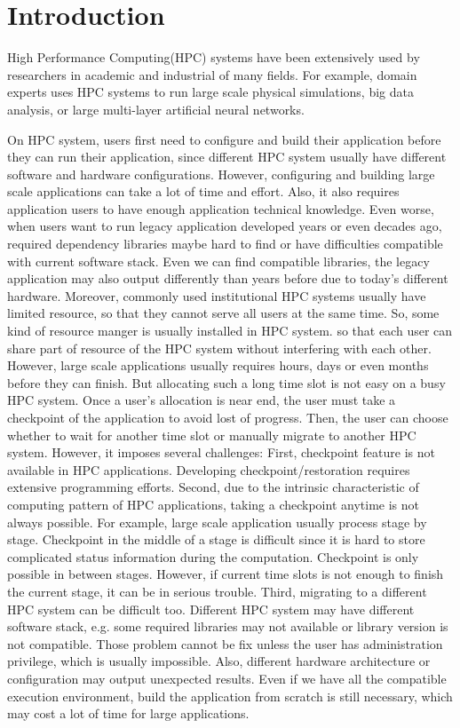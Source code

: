 \section{Introduction}
  \label{sec:introduction}

High Performance Computing(HPC) systems have been extensively used by researchers in academic and industrial of many fields. For example, domain experts uses HPC systems to run large scale physical simulations, big data analysis, or large multi-layer artificial neural networks. 

On HPC system, users first need to configure and build their application before they can run their application, since different HPC system usually have different software and hardware configurations. However, configuring and building large scale applications can take a lot of time and effort. Also, it also requires application users to have enough application technical knowledge. Even worse, when users want to run legacy application developed years or even decades ago, required dependency libraries maybe hard to find or have difficulties compatible with current software stack. Even we can find compatible libraries, the legacy application may also output differently than years before due to today's different hardware. Moreover, commonly used institutional HPC systems usually have limited resource, so that they cannot serve all users at the same time. So, some kind of resource manger is usually installed in HPC system. so that each user can share part of resource of the HPC system without interfering with each other. However, large scale applications usually requires hours, days or even months before they can finish. But allocating such a long time slot is not easy on a busy HPC system. Once a user's allocation is near end, the user must take a checkpoint of the application to avoid lost of progress. Then, the user can choose whether to wait for another time slot or manually migrate to another HPC system. However, it imposes several challenges: First, checkpoint feature is not available in HPC applications. Developing checkpoint/restoration requires extensive programming efforts. Second, due to the intrinsic characteristic of computing pattern of HPC applications, taking a checkpoint anytime is not always possible. For example, large scale application usually process stage by stage. Checkpoint in the middle of a stage is difficult since it is hard to store complicated status information during the computation. Checkpoint is only possible in between stages. However, if current time slots is not enough to finish the current stage, it can be in serious trouble. Third, migrating to a different HPC system can be difficult too. Different HPC system may have different software stack, e.g. some required libraries may not available or library version is not compatible. Those problem cannot be fix unless the user has administration privilege, which is usually impossible. Also, different hardware architecture or configuration may output unexpected results. Even if we have all the compatible execution environment, build the application from scratch is still necessary, which may cost a lot of time for large applications.   


